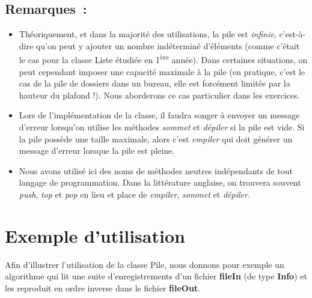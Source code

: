 	\subsection{Remarques~:}
		
		\begin{itemize}
			\item 
				Théoriquement, et dans la majorité des utilisations, la pile 
				est \textit{infinie}, c'est-à-dire qu'on peut y ajouter un
				nombre indéterminé d'éléments (comme c'était le cas pour la 
				classe Liste étudiée en 1\textsuperscript{ère} année). Dans
				certaines situations, on peut cependant imposer une capacité 
				maximale à la pile (en pratique, c'est le cas de la pile
				de dossiers dans un bureau, elle est forcément limitée par 
				la hauteur du plafond !). Nous aborderons ce cas particulier
				dans les exercices.
			\item 
				Lors de l'implémentation de la classe, il faudra songer à envoyer 
				un message d'erreur lorsqu'on utilise les méthodes
				\textit{sommet} et \textit{dépiler} si la pile est vide. 
				Si la pile possède une taille maximale, alors c'est
				\textit{empiler} qui doit générer un message d'erreur 
				lorsque la pile est pleine.
			\item
				Nous avons utilisé ici des noms de méthodes neutres indépendants 
				de tout langage de programmation. Dans la littérature
				anglaise, on trouvera souvent \textit{push}, \textit{top} et 
				\textit{pop} en lieu et place de \textit{empiler},
				\textit{sommet} et \textit{dépiler}.
		\end{itemize}
		

\section{Exemple d'utilisation}

	Afin d'illustrer l'utilisation de la classe Pile, nous donnons 
	pour exemple un algorithme qui lit une suite d'enregistrements d'un 
	fichier \textbf{fileIn} (de type \textbf{Info}) et les reproduit en 
	ordre inverse dans le fichier \textbf{fileOut}.
	
	
